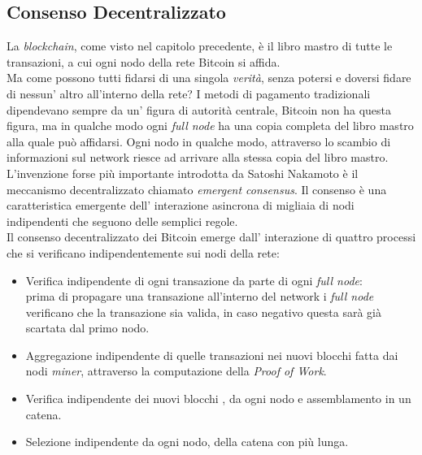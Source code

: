 \subsection{Consenso Decentralizzato}
La \textit{blockchain}, come visto nel capitolo precedente, \`e il libro mastro di tutte le transazioni, a cui ogni nodo della rete Bitcoin si affida.\\
Ma come possono tutti fidarsi di una singola \textit{verit\`a}, senza potersi e doversi fidare di nessun' altro all'interno della rete? I metodi di pagamento tradizionali dipendevano sempre da un' figura di autorit\`a centrale, Bitcoin non ha questa figura, ma in qualche modo ogni \textit{full node} ha una copia completa del libro mastro alla quale pu\`o affidarsi. Ogni nodo in qualche modo, attraverso lo scambio di informazioni sul network riesce ad arrivare alla stessa copia del libro mastro.\\
L'invenzione forse pi\`u importante introdotta da Satoshi Nakamoto \`e il meccanismo decentralizzato chiamato \textit{emergent consensus}. Il consenso \`e una caratteristica emergente dell' interazione asincrona di migliaia di nodi indipendenti che seguono delle semplici regole.\\
Il consenso decentralizzato dei Bitcoin emerge dall' interazione di quattro processi che si verificano indipendentemente sui nodi della rete: \
\begin{itemize}
\item Verifica indipendente di ogni transazione da parte di ogni \textit{full node}:\\
prima di propagare una transazione all'interno del network i \textit{full node} verificano che la transazione sia valida, in caso negativo questa sar\`a gi\`a scartata dal primo nodo.
\item Aggregazione indipendente di quelle transazioni nei nuovi blocchi fatta dai nodi \textit{miner}, attraverso la computazione della \textit{Proof of Work}.
\item Verifica indipendente dei nuovi blocchi , da ogni nodo e assemblamento in un catena.
\item Selezione indipendente da ogni nodo, della catena con pi\`u lunga.
\end{itemize}



